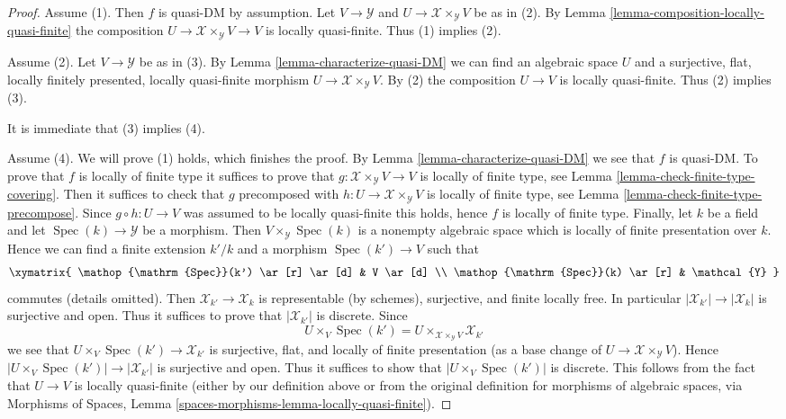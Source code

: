 \documentclass{stacks-project}
\theoremstyle{plain}
\theoremstyle{definition}
\theoremstyle{remark}
\numberwithin{equation}{subsection}
\def\Spec{\mathop{\mathrm{Spec}}}
\begin{document}
\begin{proof}
Assume (1). Then $f$ is quasi-DM by assumption. Let
$V \to \mathcal{Y}$ and $U \to \mathcal{X} \times_\mathcal{Y} V$
be as in (2). By
Lemma \ref{lemma-composition-locally-quasi-finite}
the composition $U \to \mathcal{X} \times_\mathcal{Y} V \to V$ is
locally quasi-finite. Thus (1) implies (2).

\medskip\noindent
Assume (2). Let $V \to \mathcal{Y}$ be as in (3). By
Lemma \ref{lemma-characterize-quasi-DM}
we can find an algebraic space $U$ and a surjective, flat, locally
finitely presented, locally quasi-finite morphism
$U \to \mathcal{X} \times_\mathcal{Y} V$. By (2) the composition
$U \to V$ is locally quasi-finite. Thus (2) implies (3).

\medskip\noindent
It is immediate that (3) implies (4).

\medskip\noindent
Assume (4). We will prove (1) holds, which finishes the proof. By
Lemma \ref{lemma-characterize-quasi-DM}
we see that $f$ is quasi-DM. To prove that $f$ is locally of finite type
it suffices to prove that $g : \mathcal{X} \times_\mathcal{Y} V \to V$ is
locally of finite type, see
Lemma \ref{lemma-check-finite-type-covering}.
Then it suffices to check that $g$ precomposed with
$h : U \to \mathcal{X} \times_\mathcal{Y} V$ is locally of finite type, see
Lemma \ref{lemma-check-finite-type-precompose}.
Since $g \circ h : U \to V$ was assumed to be locally quasi-finite
this holds, hence $f$ is locally of finite type.
Finally, let $k$ be a field and let $\Spec(k) \to \mathcal{Y}$
be a morphism. Then $V \times_\mathcal{Y} \Spec(k)$ is
a nonempty algebraic space which is locally of finite presentation
over $k$. Hence we can find a finite extension $k'/k$ and
a morphism $\Spec(k') \to V$ such that
$$
\xymatrix{
\Spec(k') \ar[r] \ar[d] & V \ar[d] \\
\Spec(k) \ar[r] & \mathcal{Y}
}
$$
commutes (details omitted). Then $\mathcal{X}_{k'} \to \mathcal{X}_k$
is representable (by schemes), surjective, and finite locally free. In
particular $|\mathcal{X}_{k'}| \to |\mathcal{X}_k|$ is surjective and open.
Thus it suffices to prove that $|\mathcal{X}_{k'}|$ is discrete. Since
$$
U \times_V \Spec(k') =
U \times_{\mathcal{X} \times_\mathcal{Y} V} \mathcal{X}_{k'}
$$
we see that $U \times_V \Spec(k') \to \mathcal{X}_{k'}$ is
surjective, flat, and locally of finite presentation (as a base change
of $U \to \mathcal{X} \times_\mathcal{Y} V$). Hence
$|U \times_V \Spec(k')| \to |\mathcal{X}_{k'}|$ is surjective and
open. Thus it suffices to show that $|U \times_V \Spec(k')|$ is
discrete. This follows from the fact that $U \to V$ is locally
quasi-finite (either by our definition above or from the original definition
for morphisms of algebraic spaces, via
Morphisms of Spaces, Lemma \ref{spaces-morphisms-lemma-locally-quasi-finite}).
\end{proof}
\end{document}
